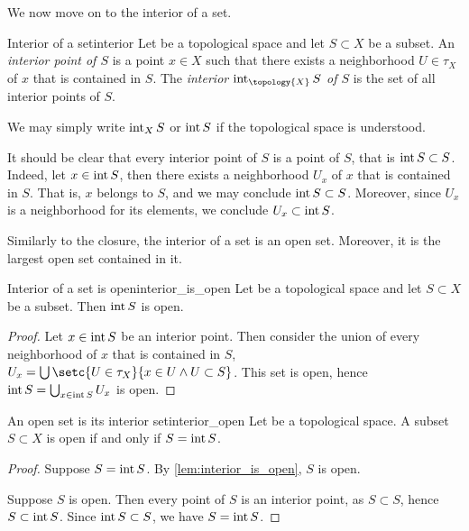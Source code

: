 We now move on to the interior of a set.
\begin{definition}{Interior of a set}{interior}
    Let  be a topological space and let \(S \subset X\) be a subset. An \emph{interior point of \(S\)} is a point \(x \in X\) such that there exists a neighborhood \(U \in \tau_X\) of \(x\) that is contained in \(S\). The \emph{interior \(\inte_{\topology{X}}S\) of \(S\)} is the set of all interior points of \(S\).
\end{definition}
\begin{remark}
    We may simply write \(\operatorname{int}_X S\) or \(\operatorname{int} S\) if the topological space is understood.
\end{remark}
\begin{remark}
    It should be clear that every interior point of \(S\) is a point of \(S\), that is \(\operatorname{int} S \subset S\). Indeed, let \(x \in \operatorname{int} S\), then there exists a neighborhood \(U_x\) of \(x\) that is contained in \(S\). That is, \(x\) belongs to \(S\), and we may conclude \(\operatorname{int} S \subset S\). Moreover, since \(U_x\) is a neighborhood for its elements, we conclude \(U_x \subset \operatorname{int} S\).
\end{remark}
Similarly to the closure, the interior of a set is an open set. Moreover, it is the largest open set contained in it.
\begin{lemma}{Interior of a set is open}{interior_is_open}
    Let  be a topological space and let \(S \subset X\) be a subset. Then \(\operatorname{int} S\) is open.
\end{lemma}
\begin{proof}
    Let \(x \in \operatorname{int} S\) be an interior point. Then consider the union of every neighborhood of \(x\) that is contained in \(S\), \(U_x = \bigcup \setc{U \in \tau_X}{x \in U \land U \subset S}\). This set is open, hence \(\operatorname{int} S = \bigcup_{x \in \operatorname{int} S} U_x\) is open.
\end{proof}
\begin{lemma}{An open set is its interior set}{interior_open}
    Let  be a topological space. A subset \(S \subset X\) is open if and only if \(S = \operatorname{int} S\).
\end{lemma}
\begin{proof}
    Suppose \(S = \operatorname{int} S\). By \cref{lem:interior_is_open}, \(S\) is open.

    Suppose \(S\) is open. Then every point of \(S\) is an interior point, as \(S \subset S\), hence \(S \subset \operatorname{int} S\). Since \(\operatorname{int} S \subset S\), we have \(S = \operatorname{int} S\).
\end{proof}
